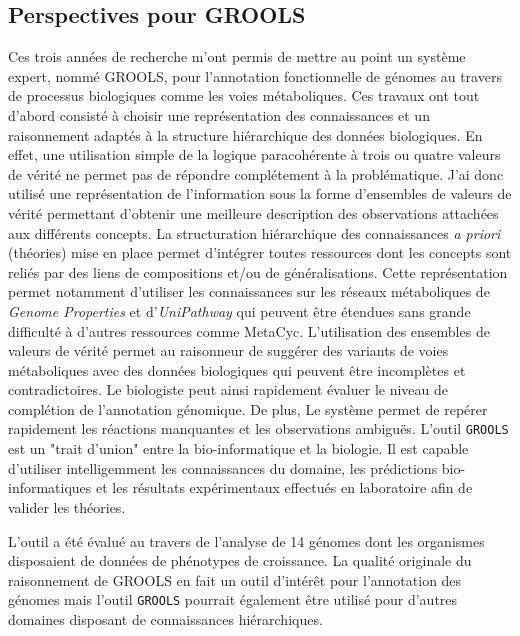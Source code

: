 
\begin{refsegment}
\chapter*{Perspectives pour GROOLS}

Ces trois années de recherche m'ont permis de mettre au point un système expert, nommé GROOLS, pour l'annotation fonctionnelle de génomes au travers de processus biologiques comme les voies métaboliques. Ces travaux ont tout d'abord consisté à choisir une représentation des connaissances et un raisonnement adaptés à la structure hiérarchique des données biologiques. En effet, une utilisation simple de la logique paracohérente à trois ou quatre valeurs de vérité ne permet pas de répondre complétement à la problématique. J'ai donc utilisé une représentation de l'information sous la forme d'ensembles de valeurs de vérité permettant d'obtenir une meilleure description des observations attachées aux différents concepts. La structuration hiérarchique des connaissances \textit{a priori} (théories) mise en place permet d'intégrer toutes ressources dont les concepts sont reliés par des liens de compositions et/ou de généralisations. Cette représentation permet notamment d'utiliser les connaissances sur les réseaux métaboliques  de \textit{Genome Properties} et d'\textit{UniPathway} qui peuvent être étendues sans grande difficulté à d'autres ressources comme MetaCyc. L'utilisation des ensembles de valeurs de vérité permet au raisonneur de suggérer des variants de voies métaboliques avec des données biologiques qui peuvent être incomplètes et contradictoires. Le biologiste peut ainsi rapidement évaluer le niveau de complétion de l'annotation génomique. De plus, Le système permet de repérer rapidement les réactions manquantes et les observations ambiguës. L'outil \texttt{GROOLS} est un "trait d'union" entre la bio-informatique et la biologie. Il est capable d'utiliser intelligemment les connaissances du domaine, les prédictions bio-informatiques et les résultats expérimentaux effectués en laboratoire afin de valider les théories.

L'outil a été évalué au travers de l'analyse de 14 génomes dont les organismes disposaient de données de phénotypes de croissance. La qualité originale du raisonnement de GROOLS en fait un outil d'intérêt pour l'annotation des génomes mais l'outil \texttt{GROOLS} pourrait également être utilisé pour d'autres domaines disposant de connaissances hiérarchiques.


\end{refsegment}
